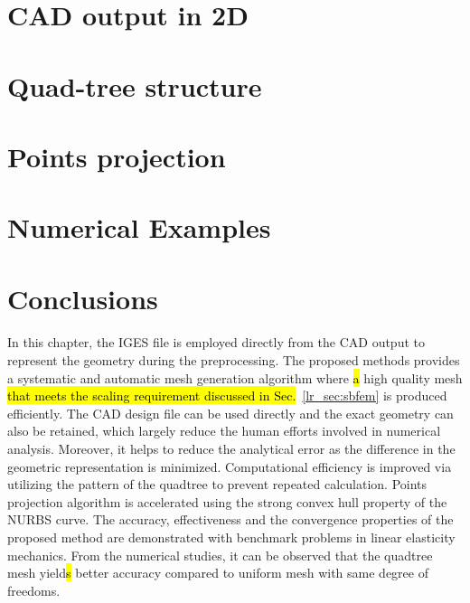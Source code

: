 \section{CAD output in 2D}
\label{qt_sc:iges}


\section{Quad-tree structure}
\label{qt_sc:quadtree}


\section{Points projection}
\label{qt_sc:projection}



\section{Numerical Examples}



% 



\section{Conclusions}
\paragraph{}
In this chapter, the IGES file is employed directly from the CAD output to represent the geometry during the preprocessing.
The proposed methods provides a systematic and automatic mesh generation algorithm where \hl{a} high quality mesh \hl{that meets the scaling requirement discussed in Sec.}~\ref{lr_sec:sbfem} is produced efficiently.
The CAD design file can be used directly and the exact geometry can also be retained, which largely reduce the human efforts involved in numerical analysis.
Moreover, it helps to reduce the analytical error as the difference in the geometric representation is minimized.
Computational efficiency is improved via utilizing the pattern of the quadtree to prevent repeated calculation.
Points projection algorithm is accelerated using the strong convex hull property of the NURBS curve.
The accuracy, effectiveness and the convergence properties of the proposed method are demonstrated with benchmark problems in linear elasticity mechanics.
From the numerical studies, it can be observed that the quadtree mesh yield\hl{s} better accuracy compared to uniform mesh with same degree of freedoms.
